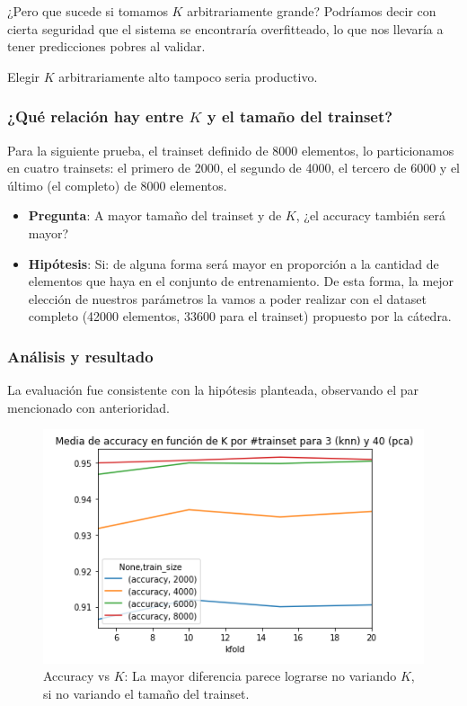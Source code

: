 ¿Pero que sucede si tomamos $K$ arbitrariamente grande? Podríamos decir con cierta seguridad que el sistema se encontraría overfitteado, lo que nos llevaría a tener predicciones pobres al validar.

Elegir $K$ arbitrariamente alto tampoco seria productivo.

\subsubsection{¿Qué relación hay entre $K$ y el tamaño del trainset?}\label{KFoldTrainSizeAcc}

Para la siguiente prueba, el trainset definido de 8000 elementos, lo particionamos en cuatro trainsets: el primero de 2000, el segundo de 4000, el tercero de 6000 y el último (el completo) de 8000 elementos.

\begin{itemize}
    \item \textbf{Pregunta}: A mayor tamaño del trainset y de $K$, ¿el accuracy también será mayor?
    \item \textbf{Hipótesis}: Si: de alguna forma será mayor en proporción a la cantidad de elementos que haya en el conjunto de entrenamiento. De esta forma, la mejor elección de nuestros parámetros la vamos a poder realizar con el dataset completo (42000 elementos, 33600 para el trainset) propuesto por la cátedra.
\end{itemize}

\subsubsection*{Análisis y resultado}

La evaluación fue consistente con la hipótesis planteada, observando el par mencionado con anterioridad.

\begin{figure}[H]
    \centering
    \includegraphics[scale=0.7]{images/KFoldAccTrainSize.png}
    \caption{Accuracy vs $K$: La mayor diferencia parece lograrse no variando $K$, si no variando el tamaño del trainset.}
    \label{fig:KFoldAccTrainSize}
\end{figure}

